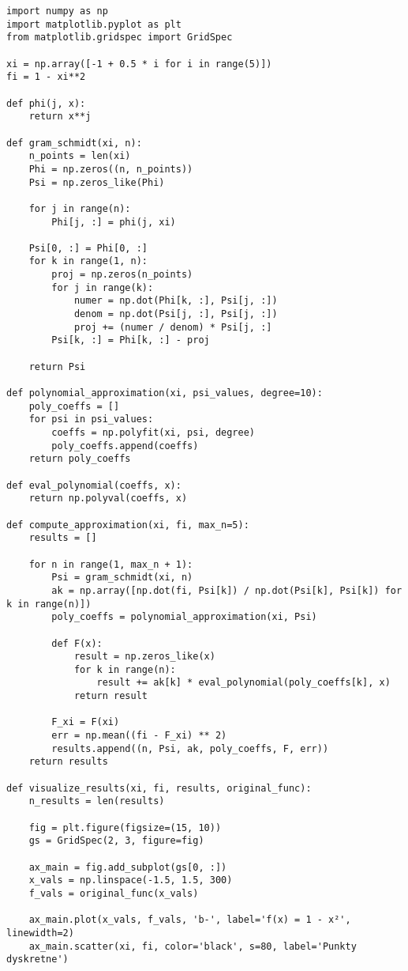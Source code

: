 \documentclass{article}
\begin{document}
\begin{verbatim}
import numpy as np
import matplotlib.pyplot as plt
from matplotlib.gridspec import GridSpec

xi = np.array([-1 + 0.5 * i for i in range(5)])
fi = 1 - xi**2

def phi(j, x):
    return x**j

def gram_schmidt(xi, n):
    n_points = len(xi)
    Phi = np.zeros((n, n_points))
    Psi = np.zeros_like(Phi)
    
    for j in range(n):
        Phi[j, :] = phi(j, xi)
        
    Psi[0, :] = Phi[0, :]
    for k in range(1, n):
        proj = np.zeros(n_points)
        for j in range(k):
            numer = np.dot(Phi[k, :], Psi[j, :])
            denom = np.dot(Psi[j, :], Psi[j, :])
            proj += (numer / denom) * Psi[j, :]
        Psi[k, :] = Phi[k, :] - proj
        
    return Psi

def polynomial_approximation(xi, psi_values, degree=10):
    poly_coeffs = []
    for psi in psi_values:
        coeffs = np.polyfit(xi, psi, degree)
        poly_coeffs.append(coeffs)
    return poly_coeffs

def eval_polynomial(coeffs, x):
    return np.polyval(coeffs, x)

def compute_approximation(xi, fi, max_n=5):
    results = []
    
    for n in range(1, max_n + 1):
        Psi = gram_schmidt(xi, n)
        ak = np.array([np.dot(fi, Psi[k]) / np.dot(Psi[k], Psi[k]) for k in range(n)])
        poly_coeffs = polynomial_approximation(xi, Psi)
        
        def F(x):
            result = np.zeros_like(x)
            for k in range(n):
                result += ak[k] * eval_polynomial(poly_coeffs[k], x)
            return result
        
        F_xi = F(xi)
        err = np.mean((fi - F_xi) ** 2)
        results.append((n, Psi, ak, poly_coeffs, F, err))
    return results

def visualize_results(xi, fi, results, original_func):
    n_results = len(results)
    
    fig = plt.figure(figsize=(15, 10))
    gs = GridSpec(2, 3, figure=fig)

    ax_main = fig.add_subplot(gs[0, :])
    x_vals = np.linspace(-1.5, 1.5, 300)
    f_vals = original_func(x_vals)
    
    ax_main.plot(x_vals, f_vals, 'b-', label='f(x) = 1 - x²', linewidth=2)
    ax_main.scatter(xi, fi, color='black', s=80, label='Punkty dyskretne')
    

\end{verbatim}
\end{document}
